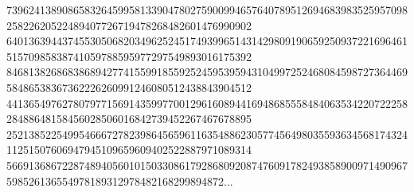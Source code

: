 {73962413890865832645995813390478027590099465764078951269468398352595709825822620522489407726719478268482601476990902\\
64013639443745530506820349625245174939965143142980919065925093722169646151570985838741059788595977297549893016175392\\
84681382686838689427741559918559252459539594310499725246808459872736446958486538367362226260991246080512438843904512\\
44136549762780797715691435997700129616089441694868555848406353422072225828488648158456028506016842739452267467678895\\
25213852254995466672782398645659611635488623057745649803559363456817432411251507606947945109659609402522887971089314\\
566913686722874894056010150330861792868092087476091782493858900971490967598526136554978189312978482168299894872...
}